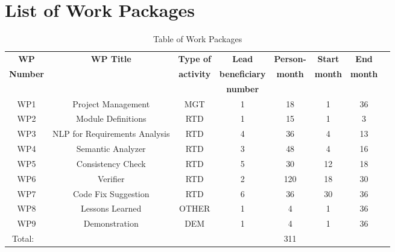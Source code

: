 \section{List of Work Packages}

\begin{table}[hbpt]\centering
	\begin{adjustbox}{width=1\textwidth}
		\begin{tabular}{ |c|c|c|c|c|c|c|c|} 
			\hline
			\textbf{WP} & \textbf{WP Title} & \textbf{Type of} & \textbf{Lead} & \textbf{Person-} & \textbf{Start} & \textbf{End} \\
			\textbf{Number} & \textbf{~} & \textbf{activity} & \textbf{beneficiary} & \textbf{month} & \textbf{month} & \textbf{month}  \\
			~ & ~ & ~ & \textbf{number} & ~ & ~ & ~ \\
			\hline
			
			WP1 & Project Management & MGT & 1 & 18 & 1 & 36 \\
			\hline
			
			WP2 & Module Definitions & RTD & 1 & 15 & 1 & 3\\
			\hline
			
			WP3 & \gls{NLP} for Requirements Analysis& RTD & 4 & 36 & 4 & 13\\
			\hline
			
			WP4 & Semantic Analyzer & RTD & 3 & 48 & 4 & 16\\
			\hline
			
			WP5 & Consistency Check & RTD & 5 & 30 & 12 & 18\\
			\hline
			
			WP6 & Verifier & RTD & 2 & 120 & 18 & 30\\
			\hline
			
			WP7 & Code Fix Suggestion & RTD & 6 & 36 & 30 & 36\\
			\hline
			
			WP8 & Lessons Learned & OTHER & 1 & 4 & 1 & 36\\
			\hline
			
			WP9 & Demonstration & DEM & 1 & 4 & 1 & 36\\
			\hline
			\hline
			
			Total: ~ & ~ & ~ & ~ & 311 & ~ &	\\
			\hline
		\end{tabular}
	\end{adjustbox}
	\caption{Table of Work Packages}
\end{table}